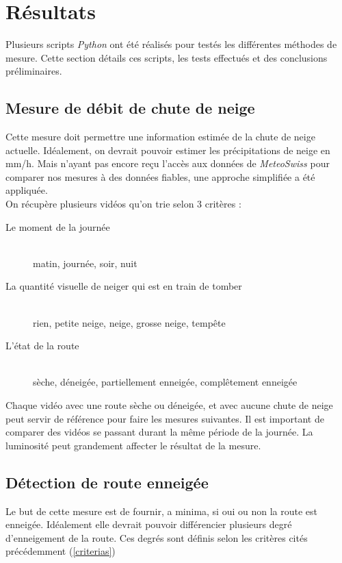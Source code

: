\section{Résultats}
Plusieurs scripts \emph{Python} ont été réalisés pour testés les différentes
méthodes de mesure. Cette section détails ces scripts, les tests effectués
et des conclusions préliminaires.

\subsection{Mesure de débit de chute de neige}
Cette mesure doit permettre une information estimée de la chute de neige
actuelle. Idéalement, on devrait pouvoir estimer les précipitations de neige
en mm/h. Mais n'ayant pas encore reçu l'accès aux données de \emph{MeteoSwiss}
pour comparer nos mesures à des données fiables, une approche simplifiée a été
appliquée.\\
On récupère plusieurs vidéos qu'on trie selon 3 critères : \label{criterias}
\begin{description}
    \item[Le moment de la journée] \hfill \\
    matin, journée, soir, nuit
    \item[La quantité visuelle de neiger qui est en train de tomber] \hfill \\
    rien, petite neige, neige, grosse neige, tempête
    \item[L'état de la route] \hfill \\
    sèche, déneigée, partiellement enneigée, complêtement enneigée
\end{description}
Chaque vidéo avec une route sèche ou déneigée, et avec aucune chute de neige
peut servir de référence pour faire les mesures suivantes.
Il est important de comparer des vidéos se passant durant la même période de la journée.
La luminosité peut grandement affecter le résultat de la mesure.

\subsection{Détection de route enneigée}
Le but de cette mesure est de fournir, a minima, si oui ou non la route
est enneigée. Idéalement elle devrait pouvoir différencier plusieurs degré
d'enneigement de la route. Ces degrés sont définis selon les critères
cités précédemment (\ref{criterias})
